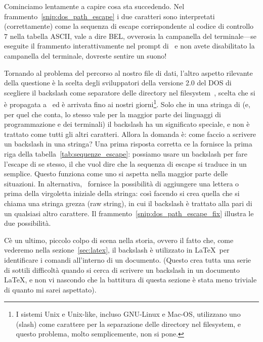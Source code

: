 Cominciamo lentamente a capire cosa sta succedendo. Nel frammento~\ref{snip:dos_path_escape}
i due caratteri  sono interpretati (correttamente) come la
sequenza di escape corrispondente al codice di controllo $7$ nella tabella ASCII,
vale a dire BEL, ovverosia la campanella del terminale---se eseguite il frammento
interattivamente nel prompt di \python\ e non avete disabilitato la campanella del
terminale, dovreste sentire un suono!

Tornando al problema del percorso al nostro file di dati, l'altro aspetto rilevante
della questione \`e la scelta degli sviluppatori della versione 2.0 del DOS di scegliere
il backslash come separatore delle directory nel filesystem~\cite{dos_backslash},
scelta che si \`e propagata a \windows\ ed \`e arrivata fino ai nostri giorni\footnote{
I sistemi Unix e Unix-like, incluso GNU-Linux e Mac-OS, utilizzano uno \cchar{/}
(slash) come carattere per la separazione delle directory nel filesystem, e questo
problema, molto semplicemente, non si pone.}.
Solo che in una stringa di \python (e, per quel che conta, lo stesso vale per la
maggior parte dei linguaggi di programmazione e dei terminali) il backslash ha un
significato speciale, e non \`e trattato come tutti gli altri caratteri. Allora la
domanda \`e: come faccio a scrivere un backslash in una stringa? Una prima risposta
corretta ce la fornisce la prima riga della tabella~\ref{tab:sequenze_escape}: possiamo
usare un backslash per fare l'escape di se stesso, il che vuol dire che la sequenza
di escape \cchar{\textbackslash{}\textbackslash} si traduce in un \cchar{\textbackslash{}}
semplice. Questo funziona come uno si aspetta nella maggior parte delle situazioni.
In alternativa, \python\ fornisce la possibilit\`a di aggiungere una lettera 
o  prima della virgoletta iniziale della stringa: cos\`i facendo si crea
quella che si chiama una stringa grezza (raw string), in cui il backslash \`e trattato
alla pari di un qualsiasi altro carattere. Il frammento~\ref{snip:dos_path_escape_fix}
illustra le due possibilit\`a.


C\`e un ultimo, piccolo colpo di scena nella storia, ovvero il fatto che, come vederemo
nella sezione~\ref{sec:latex}, il backslash \`e utilizzato in \LaTeX\ per identificare
i comandi all'interno di un documento. (Questo crea tutta una serie di sottili difficolt\`a
quando si cerca di scrivere un backslash in un documento \LaTeX, e non vi nascondo
che la battitura di questa sezione \`e stata meno triviale di quanto mi sarei aspettato).





